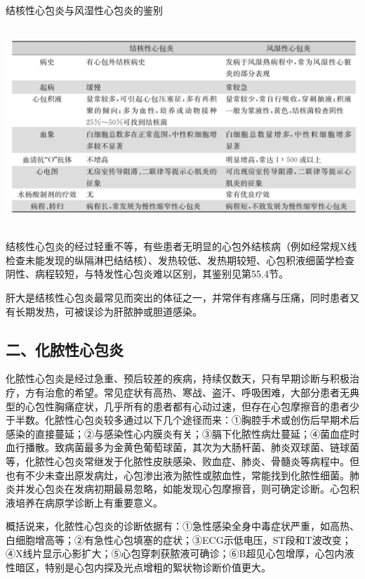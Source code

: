 \begin{table}[htbp]
\centering
\caption{结核性心包炎与风湿性心包炎的鉴别}
\label{tab17-4}
\includegraphics[width=5.98958in,height=2.95833in]{./images/Image00109.jpg}
\end{table}

结核性心包炎的经过轻重不等，有些患者无明显的心包外结核病（例如经常规X线检查未能发现的纵隔淋巴结结核）、发热较低、发热期较短、心包积液细菌学检查阴性、病程较短，与特发性心包炎难以区别，其鉴别见第55.4节。

肝大是结核性心包炎最常见而突出的体征之一，并常伴有疼痛与压痛，同时患者又有长期发热，可被误诊为肝脓肿或胆道感染。

\subsection{二、化脓性心包炎}

化脓性心包炎是经过急重、预后较差的疾病，持续仅数天，只有早期诊断与积极治疗，方有治愈的希望。常见症状有高热、寒战、盗汗、呼吸困难，大部分患者无典型的心包性胸痛症状，几乎所有的患者都有心动过速，但存在心包摩擦音的患者少于半数。化脓性心包炎较多通过以下几个途径而来：①胸腔手术或创伤后早期术后感染的直接蔓延；②与感染性心内膜炎有关；③膈下化脓性病灶蔓延；④菌血症时血行播散。致病菌最多为金黄色葡萄球菌，其次为大肠杆菌、肺炎双球菌、链球菌等，化脓性心包炎常继发于化脓性皮肤感染、败血症、肺炎、骨髓炎等病程中。但也有不少未查出原发病灶，心包渗出液为脓性或脓血性，常能找到化脓性细菌。肺炎并发心包炎在发病初期最易忽略，如能发现心包摩擦音，则可确定诊断。心包积液培养在病原学诊断上有重要意义。

概括说来，化脓性心包炎的诊断依据有：①急性感染全身中毒症状严重，如高热、白细胞增高等；②有急性心包填塞的症状；③ECG示低电压，ST段和T波改变；④X线片显示心影扩大；⑤心包穿刺获脓液可确诊；⑥B超见心包增厚，心包内液性暗区，特别是心包内探及光点增粗的絮状物诊断价值更大。

